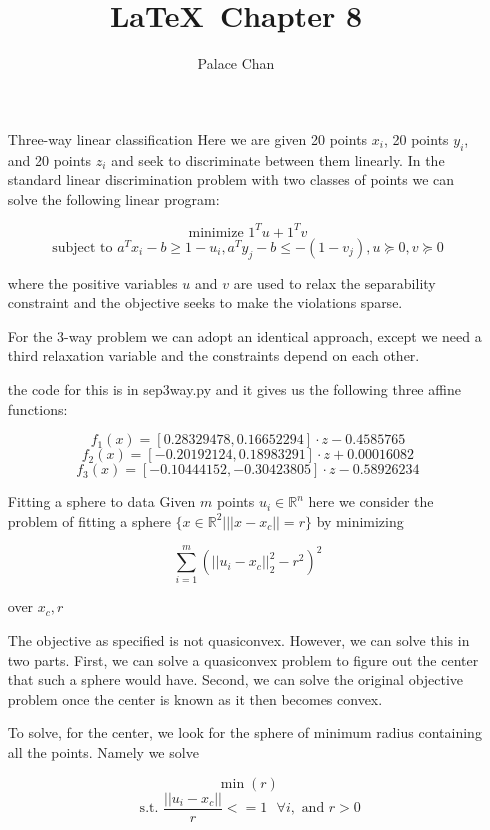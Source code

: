 \documentclass[12pt]{article}
\title{\LaTeX\ Chapter 8}
\author{Palace Chan}
\begin{document}
\maketitle
\newpage

\begin{itemize}

\item[Three-way linear classification]
  Here we are given 20 points $x_i$, 20 points $y_i$, and 20 points $z_i$ and seek to discriminate between them linearly. In the standard linear discrimination problem with two classes of points we can solve the following linear program:

  $$\text{minimize } 1^T u + 1^T v$$
  $$\text{subject to } a^T x_i - b \geq 1 - u_i, a^T y_j - b \leq -(1 - v_j), u \succeq 0, v \succeq 0$$

  where the positive variables $u$ and $v$ are used to relax the separability constraint and the objective seeks to make the violations sparse.

  For the 3-way problem we can adopt an identical approach, except we need a third relaxation variable and the constraints depend on each other.

  the code for this is in sep3way.py and it gives us the following three affine functions:

  $$f_1(x) = [0.28329478, 0.16652294] \cdot z - 0.4585765$$
  $$f_2(x) = [-0.20192124, 0.18983291] \cdot z + 0.00016082$$
  $$f_3(x) = [-0.10444152, -0.30423805] \cdot z - 0.58926234$$
  
\item[Fitting a sphere to data]
  Given $m$ points $u_i \in \mathbb{R}^n$ here we consider the problem of fitting a sphere $\{x \in \mathbb{R}^2 | ||x - x_c|| = r\}$ by minimizing

  $$\sum_{i=1}^m \left(||u_i - x_c ||_2^2 - r^2\right)^2$$

  over $x_c, r$

  The objective as specified is not quasiconvex. However, we can solve this in two parts. First, we can solve a quasiconvex problem to figure out the center that such a sphere would have. Second, we can solve the original objective problem once the center is known as it then becomes convex.

  To solve, for the center, we look for the sphere of minimum radius containing all the points. Namely we solve

  $$\min(r)$$
  $$\text{ s.t. } \frac{||u_i - x_c||}{r} <= 1 \text{  } \forall i, \text{ and } r > 0$$


\end{itemize}
\end{document}
